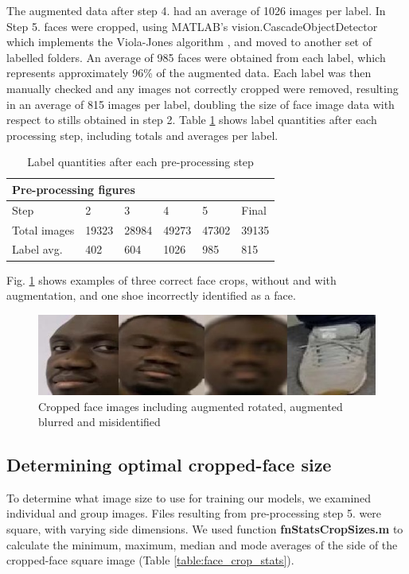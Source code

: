 The augmented data after step 4. had an average of 1026 images per label. In Step 5. faces were cropped, using MATLAB's vision.CascadeObjectDetector which implements the Viola-Jones algorithm  \cite{990517}, and moved to another set of labelled folders. An average of 985 faces were obtained from each label, which represents approximately 96\% of the augmented data.  
Each label was then manually checked and any images not correctly cropped were removed, resulting in an average of 815 images per label, doubling the size of face image data with respect to stills obtained in step 2. Table \ref {table:preproc} shows label quantities after each processing step, including totals and averages per label.
\begin{table}[h]
\centering
\begin{tabular}{|l|l|l|l|l|l|}
\hline
\multicolumn{6}{|l|}{Pre-processing figures} \\ \hline
Step  &  2 & 3 & 4 & 5 & Final\\ \hline
Total images & 19323 & 28984 & 49273 & 47302 & 39135 \\ \hline
Label avg. & 402 & 604 & 1026 & 985 & 815  \\ \hline
\end{tabular}
\caption{Label quantities after each pre-processing step}
\label{table:preproc}
\end{table}
Fig. \ref {fig:cropped_example} shows examples of three correct face crops, without and with augmentation, and one shoe incorrectly identified as a face.

\begin{figure}[h]
 \centering 
 \includegraphics[width=\columnwidth]{images/crop-examples.jpg}
 \caption{Cropped face images including augmented rotated, augmented blurred and misidentified}
 \label{fig:cropped_example}
\end{figure}

\subsection{Determining optimal cropped-face size}

To determine what image size to use for training our models, we examined individual and group images. Files resulting from pre-processing step 5. were square, with varying side dimensions. We used function \textbf{fnStatsCropSizes.m} to calculate the minimum, maximum, median and mode averages of the side of the cropped-face square image (Table \ref{table:face_crop_stats}). 

